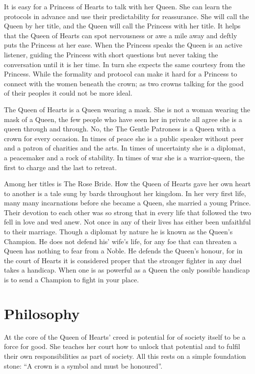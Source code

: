 It is easy for a Princess of Hearts to talk with her Queen. She can learn the protocols in advance and use their predictability for reassurance. She will call the Queen by her title, and the Queen will call the Princess with her title. It helps that the Queen of Hearts can spot nervousness or awe a mile away and deftly puts the Princess at her ease. When the Princess speaks the Queen is an active listener, guiding the Princess with short questions but never taking the conversation until it is her time. In turn she expects the same courtesy from the Princess. While the formality and protocol can make it hard for a Princess to connect with the women beneath the crown; as two crowns talking for the good of their peoples it could not be more ideal.

The Queen of Hearts is a Queen wearing a mask. She is not a woman wearing the mask of a Queen, the few people who have seen her in private all agree she is a queen through and through. No, the The Gentle Patroness is a Queen with a crown for every occasion. In times of peace she is a public speaker without peer and a patron of charities and the arts. In times of uncertainty she is a diplomat, a peacemaker and a rock of stability. In times of war she is a warrior-queen, the first to charge and the last to retreat.

Among her titles is The Rose Bride. How the Queen of Hearts gave her own heart to another is a tale sung by bards throughout her kingdom. In her very first life, many many incarnations before she became a Queen, she married a young Prince. Their devotion to each other was so strong that in every life that followed the two fell in love and wed anew. Not once in any of their lives has either been unfaithful to their marriage. Though a diplomat by nature he is known as the Queen's Champion. He does not defend his' wife's life, for any foe that can threaten a Queen has nothing to fear from a Noble. He defends the Queen's honour, for in the court of Hearts it is considered proper that the stronger fighter in any duel takes a handicap. When one is as powerful as a Queen the only possible handicap is to send a Champion to fight in your place.

\section*{Philosophy}

At the core of the Queen of Hearts' creed is potential for of society itself to be a force for good. She teaches her court how to unlock that potential and to fulfil their own responsibilities as part of society. All this rests on a simple foundation stone: \textquotedblleft A crown is a symbol and must be honoured\textquotedblright .

